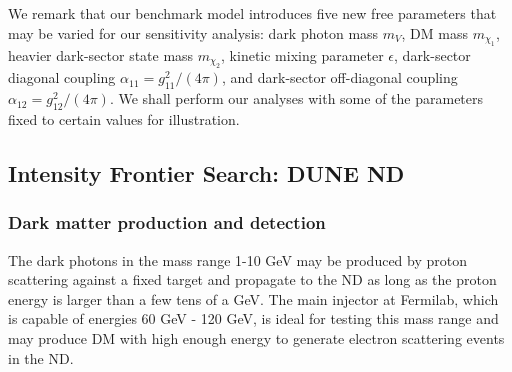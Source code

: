 We remark that our benchmark model introduces five new free parameters that may be varied for our sensitivity analysis: dark photon mass $m_V$, DM mass $m_{\chi_1}$, heavier dark-sector state mass $m_{\chi_2}$, kinetic mixing parameter $\epsilon$, dark-sector diagonal coupling $\alpha_{11} =g_{11}^2/(4\pi)$, and dark-sector off-diagonal coupling $\alpha_{12} =g_{12}^2/(4\pi)$. 
We shall perform our analyses with some of the parameters fixed to certain values for illustration.\\ 
\subsection{Intensity Frontier Search: DUNE ND \label{sec:ND}}
\subsubsection{Dark matter production and detection}
The dark photons in the mass range 1-10 GeV may be produced by proton scattering against a fixed target and propagate to the ND as long as the proton energy is larger than a few tens of a GeV. The main injector at Fermilab, which is capable of energies 60 GeV - 120 GeV, is ideal for testing this mass range  and may produce
DM with high enough energy to generate electron scattering events in the ND. 

